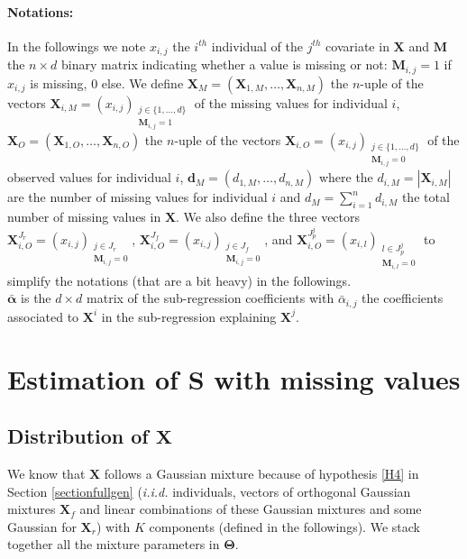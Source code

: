 \documentclass[12pt,a4paper]{report}
\begin{document}
	\paragraph{Notations:} In the followings we note $x_{i,j}$ the $i^{th}$ individual of the $j^{th}$ covariate in $\boldsymbol{X}$ and $\boldsymbol{M}$ the $n\times d$ binary matrix indicating whether a value is missing or not: $\boldsymbol{M}_{i,j}=1$ if $x_{i,j}$ is missing, 0 else. 
	We define $\boldsymbol{X}_M=(\boldsymbol{X}_{1,M},\dots,\boldsymbol{X}_{n,M})$ the $n$-uple of the vectors $\boldsymbol{X}_{i,M}=(x_{i,j})_{\substack{j \in \{1,\dots,d \} \\ \boldsymbol{M}_{i,j}=1}}$ of the missing values for individual $i$, $\boldsymbol{X}_O=(\boldsymbol{X}_{1,O},\dots,\boldsymbol{X}_{n,O})$ the $n$-uple of the vectors $\boldsymbol{X}_{i,O}=\left(x_{i,j}\right)_{\substack{j \in \{1,\dots,d \} \\ \boldsymbol{M}_{i,j}=0}}$ of the observed values for individual $i$, $\boldsymbol{d}_M=(d_{1,M},\dots,d_{n,M})$ where the $d_{i,M}=|\boldsymbol{X}_{i,M} |$ are  the number of missing values for individual $i$ and $d_M=\sum_{i=1}^nd_{i,M}$ the total number of missing values in $\boldsymbol{X}$. We also define the three vectors $\boldsymbol{X}_{i,O}^{J_r}=\left(x_{i,j}\right)_{\substack{j \in J_r \\ \boldsymbol{M}_{i,j}=0}} $, $\boldsymbol{X}_{i,O}^{J_f}=\left(x_{i,j}\right)_{\substack{j \in J_f \\ \boldsymbol{M}_{i,j}=0}} $, and $\boldsymbol{X}_{i,O}^{J_p^j}=\left(x_{i,l}\right)_{\substack{l \in J_p^j \\ \boldsymbol{M}_{i,l}=0}} $ to simplify the notations (that are a bit heavy) in the followings.\\
	
	$\bar{\boldsymbol{\alpha}}$ is the $d\times d$ matrix of the sub-regression coefficients with $\bar{\alpha}_{i,j}$ the coefficients associated to $\boldsymbol{X}^i$ in the sub-regression explaining $\boldsymbol{X}^j$.\\  
	
	

\section{Estimation of $\boldsymbol{S}$ with missing values}
\subsection{Distribution of $\boldsymbol{X}$} \label{sectionXdensity}
	We know that $\boldsymbol{X}$ follows a Gaussian mixture because of hypothesis \ref{H4} in Section \ref{sectionfullgen} ({\it i.i.d.} individuals, vectors of orthogonal Gaussian mixtures $\boldsymbol{X}_f$ and linear combinations of these Gaussian mixtures and some Gaussian for $\boldsymbol{X}_r$) with $K$ components (defined in the followings). We stack together all the mixture parameters in  $\boldsymbol{\Theta}$.%
	
\end{document}
